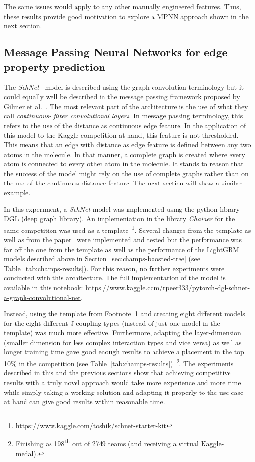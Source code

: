 The same issues would apply to any other manually engineered features. Thus, these results provide good motivation to explore a MPNN approach shown in the next section.


\subsection{Message Passing Neural Networks for edge property prediction}
\label{sec:schnet}

The \textit{SchNet}~\cite{Schutt2017} model is described using the graph convolution terminology but it could equally well be described in the message passing framework proposed by Gilmer et al.~\cite{Gilmer2017}. The most relevant part of the architecture is the use of what they call \textit{continuous- filter convolutional layers}. In message passing terminology, this refers to the use of the distance as continuous edge feature. In the application of this model to the Kaggle-competition at hand, this feature is not thresholded. This means that an edge with distance as edge feature is defined between any two atoms in the molecule. In that manner, a complete graph is created where every atom is connected to every other atom in the molecule. It stands to reason that the success of the model might rely on the use of complete graphs rather than on the use of the continuous distance feature. The next section will show a similar example.

In this experiment, a \textit{SchNet} model was implemented using the python library DGL (deep graph library). An implementation in the library \textit{Chainer} for the same competition was used as a template~\footnote{\label{fn:chainer-schnet}\url{https://www.kaggle.com/toshik/schnet-starter-kit}}. Several changes from the template as well as from the paper~\cite{Schutt2017} were implemented and tested but the performance was far off the one from the template as well as the performance of the LightGBM models described above in Section~\ref{sec:champs-boosted-tree} (see Table~\ref{tab:champs-results}). For this reason, no further experiments were conducted with this architecture. The full implementation of the model is available in this notebook: \url{https://www.kaggle.com/rpeer333/pytorch-dgl-schnet-a-graph-convolutional-net}.

Instead, using the template from Footnote~\ref{fn:chainer-schnet} and creating eight different models for the eight different J-coupling types (instead of just one model in the template) was much more effective. Furthermore, adapting the layer-dimension (smaller dimension for less complex interaction types and vice versa) as well as longer training time gave good enough results to achieve a placement in the top 10\% in the competition (see Table~\ref{tab:champs-results})~\footnote{
	Finishing as 198\textsuperscript{th} out of 2749 teams (and receiving a virtual Kaggle-medal).
}. The experiments described in this and the previous sections show that achieving competitive results with a truly novel approach would take more experience and more time while simply taking a working solution and adapting it properly to the use-case at hand can give good results within reasonable time.



